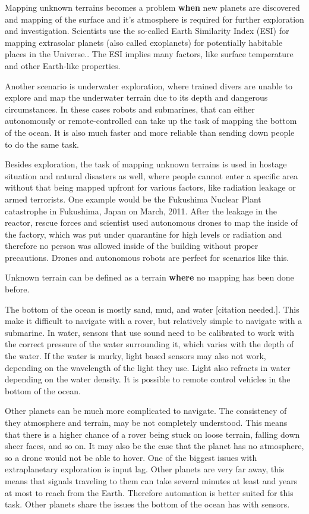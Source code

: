 Mapping unknown terrains becomes a problem \textbf{when} new planets are discovered and mapping of the surface and it's atmosphere is required for further exploration and investigation. Scientists use the so-called Earth Similarity Index (ESI) for mapping extrasolar planets (also called exoplanets) for potentially habitable places in the Universe.\cite{exoplanets}\cite{esi}. The ESI implies many factors, like surface temperature and other Earth-like properties. 

Another scenario is underwater exploration, where trained divers are unable to explore and map the underwater terrain due to its depth and dangerous circumstances. In these cases robots and submarines, that can either autonomously or remote-controlled can take up the task of mapping the bottom of the ocean. It is also much faster and more reliable than sending down people to do the same task.

Besides exploration, the task of mapping unknown terrains is used in hostage situation and natural disasters as well, where people cannot enter a specific area without that being mapped upfront for various factors, like radiation leakage or armed terrorists. One example would be the Fukushima Nuclear Plant catastrophe in Fukushima, Japan on March, 2011. After the leakage in the reactor, rescue forces and scientist used autonomous drones to map the inside of the factory\cite{fukushima}, which was put under quarantine for high levels or radiation and therefore no person was allowed inside of the building without proper precautions. Drones and autonomous robots are perfect for scenarios like this.

Unknown terrain can be defined as a terrain \textbf{where} no mapping has been done before.

The bottom of the ocean is mostly sand, mud, and water [citation needed.]. This make it difficult to navigate with a rover, but relatively simple to navigate with a submarine. In water, sensors that use sound need to be calibrated to work with the correct pressure of the water surrounding it, which varies with the depth of the water. If the water is murky, light based sensors may also not work, depending on the wavelength of the light they use. Light also refracts in water depending on the water density. It is possible to remote control vehicles in the bottom of the ocean.

Other planets can be much more complicated to navigate. The consistency of they atmosphere and terrain, may be not completely understood. This means that there is a higher chance of a rover being stuck on loose terrain, falling down sheer faces, and so on. It may also be the case that the planet has no atmosphere, so a drone would not be able to hover. One of the biggest issues with extraplanetary exploration is input lag. Other planets are very far away, this means that signals traveling to them can take several minutes at least and years at most to reach from the Earth. Therefore automation is better suited for this task. Other planets share the issues the bottom of the ocean has with sensors.

